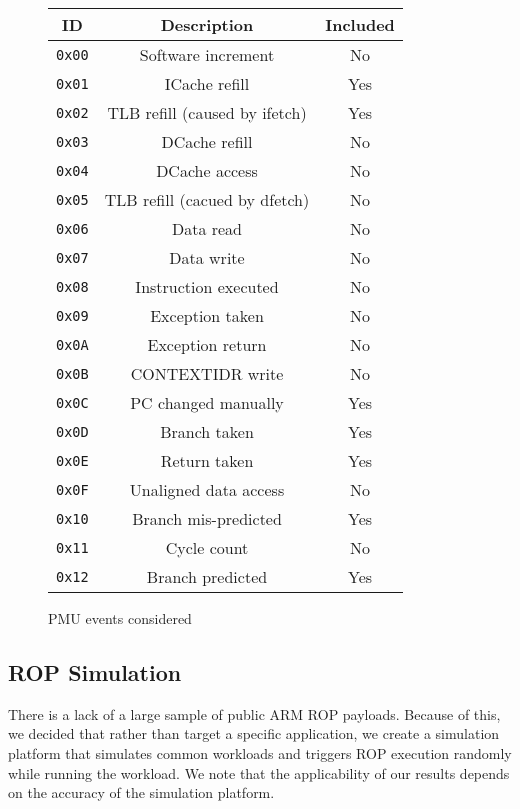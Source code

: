 \documentclass[letterpaper,twocolumn,10pt]{article}
\begin{document}
\begin{figure}
\begin{center}
\begin{tabular}{ |c|c|c| } 
\hline
ID & Description & Included \\
\hline
\texttt{0x00} & Software increment & No \\ 
\texttt{0x01} & ICache refill & Yes \\ 
\texttt{0x02} & TLB refill (caused by ifetch) & Yes \\ 
\texttt{0x03} & DCache refill & No \\ 
\texttt{0x04} & DCache access & No \\ 
\texttt{0x05} & TLB refill (cacued by dfetch) & No \\ 
\texttt{0x06} & Data read & No \\ 
\texttt{0x07} & Data write & No \\ 
\texttt{0x08} & Instruction executed & No \\ 
\texttt{0x09} & Exception taken & No \\ 
\texttt{0x0A} & Exception return & No \\ 
\texttt{0x0B} & CONTEXTIDR write & No \\ 
\texttt{0x0C} & PC changed manually & Yes \\ 
\texttt{0x0D} & Branch taken & Yes \\ 
\texttt{0x0E} & Return taken & Yes \\ 
\texttt{0x0F} & Unaligned data access & No \\ 
\texttt{0x10} & Branch mis-predicted & Yes \\ 
\texttt{0x11} & Cycle count & No \\ 
\texttt{0x12} & Branch predicted & Yes \\ 
\hline
\end{tabular}
\end{center}
\caption{PMU events considered}
\label{fig:events}
\end{figure}

\subsection*{ROP Simulation}

There is a lack of a large sample of public ARM ROP payloads. Because of this, we decided that rather than target a 
specific application, we create a simulation platform that simulates common workloads and triggers ROP execution 
randomly while running the workload. We note that the applicability of our results depends on the accuracy of the 
simulation platform.
\end{document}
